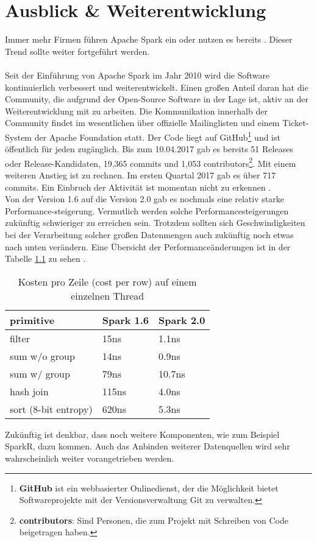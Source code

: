 \newpage
\chapter{Ausblick \& Weiterentwicklung} 

Immer mehr Firmen führen Apache Spark ein oder nutzen es bereits \cite{HEISEBIGDATA}. Dieser Trend sollte weiter fortgeführt werden.
\\ \\
\noindent
Seit der Einführung von Apache Spark im Jahr 2010 wird die Software kontinuierlich verbessert und weiterentwickelt. 
Einen großen Anteil daran hat die Community, die aufgrund der Open-Source Software in der Lage ist, aktiv an der Weiterentwicklung mit zu arbeiten. 
Die Kommunikation innerhalb der Community findet im wesentlichen über offizielle Mailinglisten und einem Ticket-System der Apache Foundation statt.
Der Code liegt auf GitHub\footnote{\textbf{GitHub} ist ein webbasierter Onlinedienst, der die Möglichkeit bietet Softwareprojekte mit der Versionsverwaltung Git zu verwalten.} und ist öffentlich für jeden zugänglich. 
Bis zum 10.04.2017 gab es bereits 51 Releases oder Release-Kandidaten, 19,365 commits und 1,053 contributors\footnote{\textbf{contributors}: Sind Personen, die zum Projekt mit Schreiben von Code beigetragen haben.}.
Mit einem weiteren Anstieg ist zu rechnen. Im ersten Quartal 2017 gab es über 717 commits. Ein Einbruch der Aktivität ist momentan nicht zu erkennen \cite{GITHUB}. \\


\noindent
Von der Version 1.6 auf die Version 2.0 gab es nochmals eine relativ starke Performance-steigerung. Vermutlich werden solche Performancesteigerungen zukünftig schwieriger zu erreichen sein. Trotzdem sollten sich  Geschwindigkeiten bei der Verarbeitung solcher großen Datenmengen auch zukünftig noch etwas nach unten verändern. Eine Übersicht der Performanceänderungen ist in der Tabelle \ref{tab:spark_2_0} zu sehen \cite{DATABRICK_SPARK_2_0}.


\begin{table}[h]
  \centering
		
		  \begin{tabular}[t]{|l|l|l|}
    \hline
		
		\rowcolor[gray]{.9}
		
				primitive	 & Spark 1.6 &  Spark 2.0 \\ \hline				
				filter &	15ns &	1.1ns \\ \hline				
				sum w/o group &	14ns &	0.9ns \\ \hline				
				sum w/ group &	79ns &	10.7ns \\ \hline				
				hash join	& 115ns	& 4.0ns \\ \hline				
				sort (8-bit entropy)	& 620ns	 & 5.3ns \\ \hline				

  \end{tabular}
		
  \caption{Kosten pro Zeile (cost per row) auf einem einzelnen Thread}\label{tab:spark_2_0}
\end{table}



\noindent
Zukünftig ist denkbar, dass noch weitere Komponenten, wie zum Beispiel SparkR, dazu kommen. Auch das Anbinden weiterer Datenquellen wird sehr wahrscheinlich weiter vorangetrieben werden.